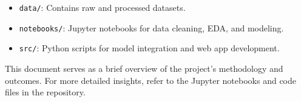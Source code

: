 \documentclass[12pt]{article}
\begin{document}
\begin{itemize}
    \item \texttt{data/}: Contains raw and processed datasets.
    \item \texttt{notebooks/}: Jupyter notebooks for data cleaning, EDA, and modeling.
    \item \texttt{src/}: Python scripts for model integration and web app development.
\end{itemize}

This document serves as a brief overview of the project's methodology and outcomes. For more detailed insights, refer to the Jupyter notebooks and code files in the repository.
\end{document}
